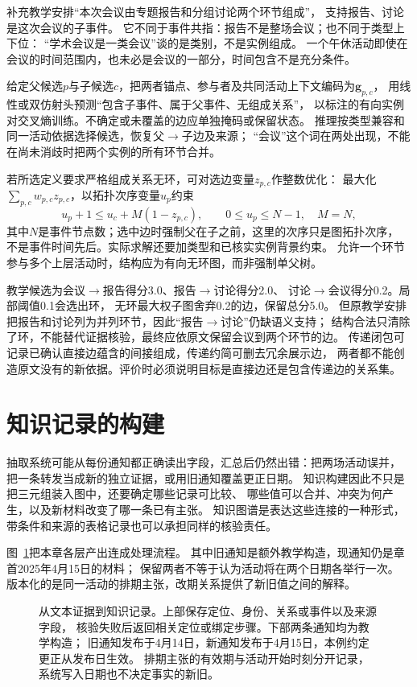 补充教学安排“本次会议由专题报告和分组讨论两个环节组成”，
支持报告、讨论是这次会议的子事件。
它不同于事件共指：报告不是整场会议；也不同于类型上下位：
“学术会议是一类会议”谈的是类别，不是实例组成。
一个午休活动即使在会议的时间范围内，也未必是会议的一部分，时间包含不是充分条件。

给定父候选$p$与子候选$c$，把两者锚点、参与者及共同活动上下文编码为$\bm{g}_{p,c}$，
用线性或双仿射头预测“包含子事件、属于父事件、无组成关系”，
以标注的有向实例对交叉熵训练。不确定或未覆盖的边应单独掩码或保留状态。
推理按类型兼容和同一活动依据选择候选，恢复父$\to$子边及来源；
“会议”这个词在两处出现，不能在尚未消歧时把两个实例的所有环节合并。

若所选定义要求严格组成关系无环，可对选边变量$z_{p,c}$作整数优化：
最大化$\sum_{p,c}w_{p,c}z_{p,c}$，以拓扑次序变量$u_p$约束
\begin{equation}
  u_p+1\leq u_c+M(1-z_{p,c}),\qquad
  0\leq u_p\leq N-1,\quad M=N,
  \label{eq:nlp-extraction-subevent-ilp}
\end{equation}
其中$N$是事件节点数；选中边时强制父在子之前，这里的次序只是图拓扑次序，
不是事件时间先后。实际求解还要加类型和已核实实例背景约束。
允许一个环节参与多个上层活动时，结构应为有向无环图，而非强制单父树。

教学候选为会议$\to$报告得分3.0、报告$\to$讨论得分2.0、
讨论$\to$会议得分0.2。局部阈值0.1会选出环，
无环最大权子图舍弃0.2的边，保留总分5.0。
但原教学安排把报告和讨论列为并列环节，因此“报告$\to$讨论”仍缺语义支持；
结构合法只清除了环，不能替代证据核验，最终应依原文保留会议到两个环节的边。
传递闭包可记录已确认直接边蕴含的间接组成，传递约简可删去冗余展示边，
两者都不能创造原文没有的新依据。评价时必须说明目标是直接边还是包含传递边的关系集。

\section{知识记录的构建}
\label{sec:nlp-extraction-records}

抽取系统可能从每份通知都正确读出字段，汇总后仍然出错：把两场活动误并，
把一条转发当成新的独立证据，或用旧通知覆盖更正日期。
知识构建因此不只是把三元组装入图中，还要确定哪些记录可比较、
哪些值可以合并、冲突为何产生，以及新材料改变了哪一条已有主张。
知识图谱是表达这些连接的一种形式，带条件和来源的表格记录也可以承担同样的核验责任。

图~\ref{fig:nlp-extraction-records}把本章各层产出连成处理流程。
其中旧通知是额外教学构造，现通知仍是章首2025年4月15日的材料；
保留两者不等于认为活动将在两个日期各举行一次。
版本化的是同一活动的排期主张，改期关系提供了新旧值之间的解释。
\begin{figure}[htbp]
  \centering
  
  \caption{从文本证据到知识记录。上部保存定位、身份、关系或事件以及来源字段，
  核验失败后返回相关定位或绑定步骤。下部两条通知均为教学构造；
  旧通知发布于4月14日，新通知发布于4月15日，本例约定更正从发布日生效。
  排期主张的有效期与活动开始时刻分开记录，系统写入日期也不决定事实的新旧。}
  \label{fig:nlp-extraction-records}
\end{figure}

